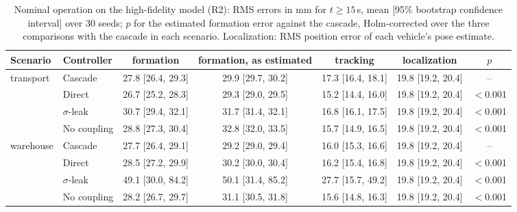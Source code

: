 \begin{table}[!t]\centering\footnotesize
\caption{Nominal operation on the high-fidelity model (R2): RMS errors in mm for $t\ge15$\,s, mean [95\% bootstrap confidence interval] over 30 seeds; $p$ for the estimated formation error against the cascade, Holm-corrected over the three comparisons with the cascade in each scenario. Localization: RMS position error of each vehicle's pose estimate.}\label{tab:r2_nominal}
\begin{adjustbox}{max width=\textwidth}
\begin{tabular}{@{}llccccc@{}}\toprule
Scenario & Controller & formation & formation, as estimated & tracking & localization & $p$\\\midrule
transport & Cascade & 27.8 [26.4, 29.3] & 29.9 [29.7, 30.2] & 17.3 [16.4, 18.1] & 19.8 [19.2, 20.4] & --\\
 & Direct & 26.7 [25.2, 28.3] & 29.3 [29.0, 29.5] & 15.2 [14.4, 16.0] & 19.8 [19.2, 20.4] & $<$0.001\\
 & $\sigma$-leak & 30.7 [29.4, 32.1] & 31.7 [31.4, 32.1] & 16.8 [16.1, 17.5] & 19.8 [19.2, 20.4] & $<$0.001\\
 & No coupling & 28.8 [27.3, 30.4] & 32.8 [32.0, 33.5] & 15.7 [14.9, 16.5] & 19.8 [19.2, 20.4] & $<$0.001\\
\addlinespace
warehouse & Cascade & 27.7 [26.4, 29.1] & 29.2 [29.0, 29.4] & 16.0 [15.3, 16.6] & 19.8 [19.2, 20.4] & --\\
 & Direct & 28.5 [27.2, 29.9] & 30.2 [30.0, 30.4] & 16.2 [15.4, 16.8] & 19.8 [19.2, 20.4] & $<$0.001\\
 & $\sigma$-leak & 49.1 [30.0, 84.2] & 50.1 [31.4, 85.2] & 27.7 [15.7, 49.2] & 19.8 [19.2, 20.4] & $<$0.001\\
 & No coupling & 28.2 [26.7, 29.7] & 31.1 [30.5, 31.8] & 15.6 [14.8, 16.3] & 19.8 [19.2, 20.4] & $<$0.001\\
\bottomrule\end{tabular}
\end{adjustbox}
\end{table}
